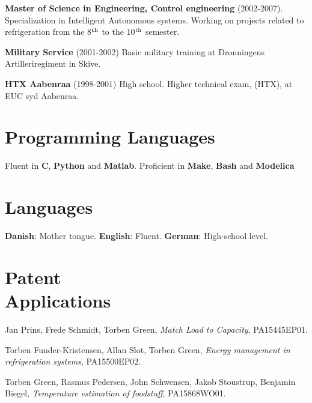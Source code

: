 \documentclass[margin,line,a4paper]{resume}
\begin{document}
\begin{resume}
    \textbf{Master of Science in Engineering, Control engineering}
    (2002-2007). Specialization in Intelligent Autonomous systems. Working on projects related to refrigeration from the 8$^{\rm th}$ to the 10$^{\rm th}$ semester.
    
    \textbf{Military Service} (2001-2002) Basic military training at Dronningens Artilleriregiment in Skive.

    \textbf{HTX Aabenraa} (1998-2001) High school.  Higher technical exam, (HTX), at EUC syd Aabenraa.


\section{\mysidestyle Programming Languages}

Fluent in \textbf{C}, \textbf{Python} and \textbf{Matlab}. Proficient in \textbf{Make}, \textbf{Bash} and \textbf{Modelica}

\section{\mysidestyle Languages}

\textbf{Danish}: Mother tongue. \textbf{English}: Fluent. \textbf{German}: High-school level.




\section{\mysidestyle Patent \\Applications}

Jan Prins, Frede Schmidt, Torben Green, \textit{Match Load to Capacity}, PA15445EP01.

Torben Funder-Kristensen, Allan Slot, Torben Green, \textit{Energy management in refrigeration systems}, PA15500EP02.

Torben Green, Rasmus Pedersen, John Schwensen, Jakob Stoustrup, Benjamin Biegel, \textit{Temperature estimation of foodstuff}, PA15868WO01.


\end{resume}
\end{document}
